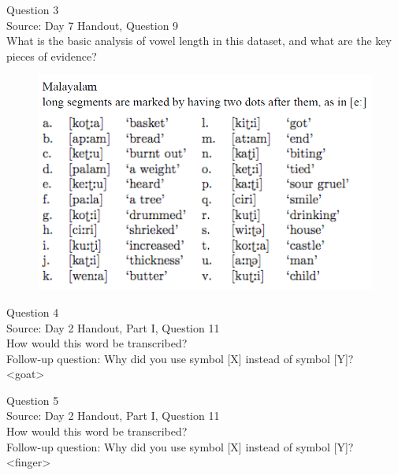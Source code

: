 \documentclass[12pt]{article}
\begin{document}
\newpage

{\large Question 3}\\

Source: Day 7 Handout, Question 9\\

What is the basic analysis of vowel length in this dataset, and what are the key pieces of evidence?\\

\begin{figure}[H]
\includegraphics{../images/malayalam.png}
\end{figure}

\newpage

{\large Question 4}\\

Source: Day 2 Handout, Part I, Question 11\\

How would this word be transcribed?\\ Follow-up question: Why did you use symbol [X] instead of symbol [Y]?\\

<goat>


\newpage

{\large Question 5}\\

Source: Day 2 Handout, Part I, Question 11\\

How would this word be transcribed?\\ Follow-up question: Why did you use symbol [X] instead of symbol [Y]?\\

<finger>


\newpage
\end{document}
